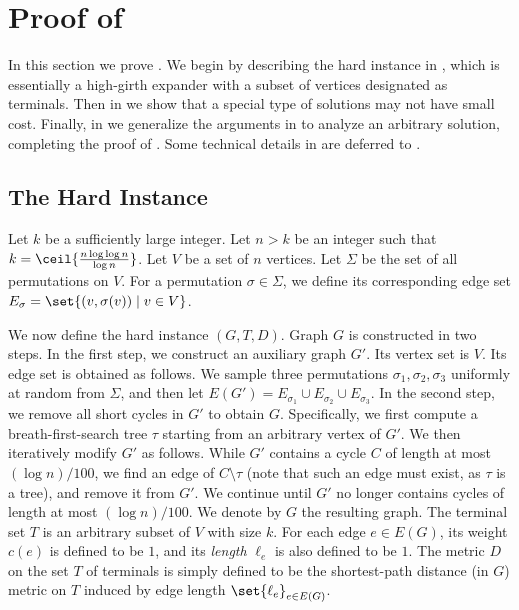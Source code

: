 \section{Proof of }

In this section we prove . We begin by describing the hard instance in , which is essentially a high-girth expander with a subset of vertices designated as terminals. Then in  we show that a special type of solutions may not have small cost. Finally, in  we generalize the arguments in  to analyze an arbitrary solution, completing the proof of . Some technical details in  are deferred to .



\subsection{The Hard Instance}
\label{subsec: instance}

Let $k$ be a sufficiently large integer.
Let $n>k$ be an integer such that $k=\ceil{\frac{n\log \log n}{\log n}}$.
Let $V$ be a set of $n$ vertices.
Let $\Sigma$ be the set of all permutations on $V$. For a permutation $\sigma\in \Sigma$, we define its corresponding edge set $E_{\sigma}=\set{(v,\sigma(v))\mid v\in V}$.

We now define the hard instance $(G,T,D)$. 
Graph $G$ is constructed in two steps. In the first step, we construct an auxiliary graph $G'$.
Its vertex set is $V$. Its edge set is obtained as follows. We sample three permutations $\sigma_1,\sigma_2,\sigma_3$ uniformly at random from $\Sigma$, and then let $E(G')=E_{\sigma_1}\cup E_{\sigma_2}\cup E_{\sigma_3}$.
In the second step, we remove all short cycles in $G'$ to obtain $G$.
%
Specifically, we first compute a breath-first-search tree $\tau$ starting from an arbitrary vertex of $G'$.
We then iteratively modify $G'$ as follows.
While $G'$ contains a cycle $C$ of length at most $(\log n)/100$, we find an edge of $C\setminus \tau$ (note that such an edge must exist, as $\tau$ is a tree), and remove it from $G'$. We continue until $G'$ no longer contains cycles of length at most $(\log n)/100$. We denote by $G$ the resulting graph.
%
The terminal set $T$ is an arbitrary subset of $V$ with size $k$. For each edge $e\in E(G)$, its weight $c(e)$ is defined to be $1$, and its \emph{length} $\ell_e$ is also defined to be $1$. The metric $D$ on the set $T$ of terminals is simply defined to be the shortest-path distance (in $G$) metric on $T$ induced by edge length $\set{\ell_e}_{e\in E(G)}$.



